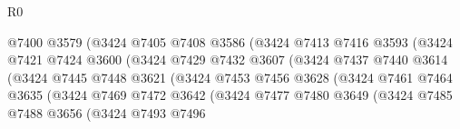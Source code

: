 \begin{lexlean}{R0}
\begin{coremodule}
                                    @7400
                                    @3579
                                    (@3424
                                      @7405
                                      @7408
                                      @3586
                                      (@3424
                                        @7413
                                        @7416
                                        @3593
                                        (@3424
                                          @7421
                                          @7424
                                          @3600
                                          (@3424
                                            @7429
                                            @7432
                                            @3607
                                            (@3424
                                              @7437
                                              @7440
                                              @3614
                                              (@3424
                                                @7445
                                                @7448
                                                @3621
                                                (@3424
                                                  @7453
                                                  @7456
                                                  @3628
                                                  (@3424
                                                    @7461
                                                    @7464
                                                    @3635
                                                    (@3424
                                                      @7469
                                                      @7472
                                                      @3642
                                                      (@3424
                                                        @7477
                                                        @7480
                                                        @3649
                                                        (@3424
                                                          @7485
                                                          @7488
                                                          @3656
                                                          (@3424
                                                            @7493
                                                            @7496

\end{coremodule}
\end{lexlean}
